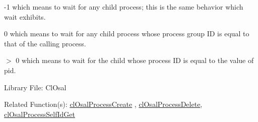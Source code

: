 -1 which means to wait for any child process; this is the same behavior which wait exhibits.

0 which means to wait for any child process whose process group ID is equal to that of the calling process.

$>$ 0 which means to wait for the child whose process ID is equal to the value of pid.

\begin{Desc}
\item[Library File:]Cl\-Osal\end{Desc}
\begin{Desc}
\item[Related Function(s):]\hyperlink{pageosal139}{cl\-Osal\-Process\-Create} , \hyperlink{pageosal142}{cl\-Osal\-Process\-Delete}, 
\hyperlink{pageosal144}{cl\-Osal\-Process\-Self\-Id\-Get} \end{Desc}

\newpage
